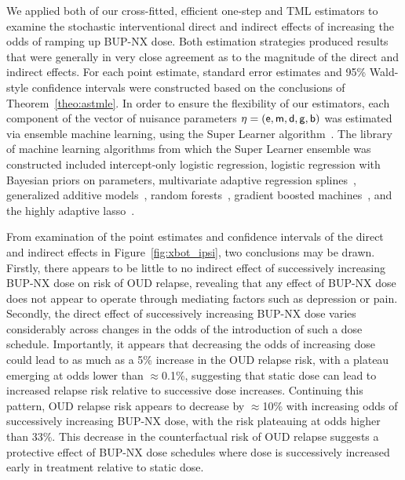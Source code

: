 We applied both of our cross-fitted, efficient one-step and TML estimators to
examine the stochastic interventional direct and indirect effects of increasing
the odds of ramping up BUP-NX dose. Both estimation strategies produced results
that were generally in very close agreement as to the magnitude of the direct
and indirect effects. For each point estimate, standard error estimates and 95\%
Wald-style confidence intervals were constructed based on the conclusions of
Theorem~\ref{theo:astmle}. In order to ensure the flexibility of our estimators,
each component of the vector of nuisance parameters $\eta = (\mathsf{e}, \mathsf{m}, \mathsf{d}, \mathsf{g},
\mathsf{b})$ was estimated via ensemble machine learning, using the Super Learner
algorithm~\citep{vdl2007super, coyle2021sl3}. The library of machine learning
algorithms from which the Super Learner ensemble was constructed included
intercept-only logistic regression, logistic regression with Bayesian priors on
parameters, multivariate adaptive regression
splines~\citep{friedman1991multivariate}, generalized additive
models~\citep{hastie1990generalized}, random forests~\citep{breiman2001random},
gradient boosted machines~\citep{friedman2001greedy}, and the highly adaptive
lasso~\citep{benkeser2016highly, coyle2021hal9001, hejazi2020hal9001}.

From examination of the point estimates and confidence intervals of the direct
and indirect effects in Figure~\ref{fig:xbot_ipsi}, two conclusions may be
drawn. Firstly, there appears to be little to no indirect effect of successively
increasing BUP-NX dose on risk of OUD relapse, revealing that any effect of
BUP-NX dose does not appear to operate through mediating factors such as
depression or pain. Secondly, the direct effect of successively increasing
BUP-NX dose varies considerably across changes in the odds of the introduction
of such a dose schedule. Importantly, it appears that decreasing the odds of
increasing  dose could lead to as much as a 5\% increase in the OUD relapse
risk, with a plateau emerging at odds lower than $\approx$0.1\%, suggesting that
static dose can lead to increased relapse risk relative to successive dose
increases. Continuing this pattern, OUD relapse risk appears to decrease by
$\approx$10\% with increasing odds of successively increasing BUP-NX dose, with
the risk plateauing at odds higher than 33\%. This decrease in the
counterfactual risk of OUD relapse suggests a protective effect of BUP-NX dose
schedules where dose is successively increased early in treatment relative to
static dose.


